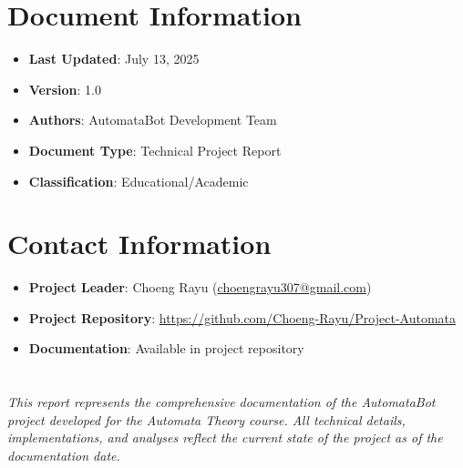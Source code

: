 \documentclass[12pt]{article}
\begin{document}
\section*{Document Information}
\begin{itemize}
    \item \textbf{Last Updated}: July 13, 2025
    \item \textbf{Version}: 1.0
    \item \textbf{Authors}: AutomataBot Development Team
    \item \textbf{Document Type}: Technical Project Report
    \item \textbf{Classification}: Educational/Academic
\end{itemize}

\section*{Contact Information}
\begin{itemize}
    \item \textbf{Project Leader}: Choeng Rayu (\href{mailto:choengrayu307@gmail.com}{choengrayu307@gmail.com})
    \item \textbf{Project Repository}: \href{https://github.com/Choeng-Rayu/Project-Automata}{https://github.com/Choeng-Rayu/Project-Automata}
    \item \textbf{Documentation}: Available in project repository
\end{itemize}

\section*{}
\emph{This report represents the comprehensive documentation of the AutomataBot project developed for the Automata Theory course. All technical details, implementations, and analyses reflect the current state of the project as of the documentation date.}
\end{document}
